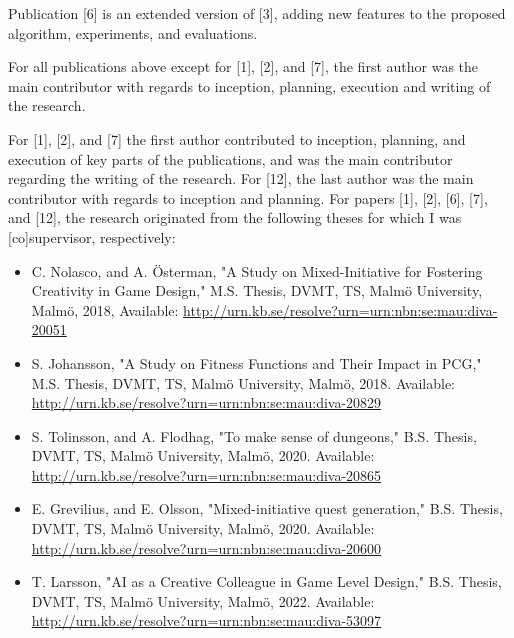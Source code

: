 \documentclass[hidelinks,green,onecolumn,twoside]{dissertation}
\begin{document}
{\selectfont

Publication [6] is an extended version of [3], adding new features to the proposed algorithm, experiments, and evaluations.

For all publications above except for [1], [2], and [7], the first author was the main contributor with regards to inception, planning, execution and writing of the research. %

For [1], [2], and [7] the first author contributed to inception, planning, and execution of key parts of the publications, and was the main contributor regarding the writing of the research. For [12], the last author was the main contributor with regards to inception and planning. For papers [1], [2], [6], [7], and [12], the research originated from the following theses for which I was [co]supervisor, respectively:

\begin{itemize}
    \item C. Nolasco, and A. Österman, "A Study on Mixed-Initiative for Fostering Creativity in Game Design," M.S. Thesis, DVMT, TS, Malmö University, Malmö, 2018, Available: \url{http://urn.kb.se/resolve?urn=urn:nbn:se:mau:diva-20051}
    
    \item S. Johansson, "A Study on Fitness Functions and Their Impact in PCG," M.S. Thesis, DVMT, TS, Malmö University, Malmö, 2018. Available: \url{http://urn.kb.se/resolve?urn=urn:nbn:se:mau:diva-20829}
    
    \item S. Tolinsson, and A. Flodhag, "To make sense of dungeons," B.S. Thesis, DVMT, TS, Malmö University, Malmö, 2020. Available: \url{http://urn.kb.se/resolve?urn=urn:nbn:se:mau:diva-20865}
    
    \item E. Grevilius, and E. Olsson, "Mixed-initiative quest generation," B.S. Thesis, DVMT, TS, Malmö University, Malmö, 2020. Available: \url{http://urn.kb.se/resolve?urn=urn:nbn:se:mau:diva-20600}
    
    \item T. Larsson, "AI as a Creative Colleague in Game Level Design," B.S. Thesis, DVMT, TS, Malmö University, Malmö, 2022. Available: \url{http://urn.kb.se/resolve?urn=urn:nbn:se:mau:diva-53097}
\end{itemize}
    
    
    
}
\end{document}
